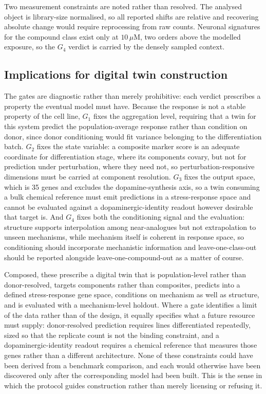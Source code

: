 \documentclass[5p,times,twocolumn]{elsarticle}
\begin{document}
Two measurement constraints are noted rather than resolved. The analysed object
is library-size normalised, so all reported shifts are relative and recovering
absolute change would require reprocessing from raw counts. Neuronal signatures
for the compound class exist only at $10\,\mu$M, two orders above the modelled
exposure, so the $G_4$ verdict is carried by the densely sampled context.

\subsection{\textbf{Implications for digital twin construction}}

The gates are diagnostic rather than merely prohibitive: each verdict prescribes
a property the eventual model must have. Because the response is not a stable
property of the cell line, $G_1$ fixes the aggregation level, requiring that a
twin for this system predict the population-average response rather than
condition on donor, since donor conditioning would fit variance belonging to the
differentiation batch. $G_2$ fixes the state variable: a composite marker score
is an adequate coordinate for differentiation stage, where its components
covary, but not for prediction under perturbation, where they need not, so
perturbation-responsive dimensions must be carried at component resolution.
$G_3$ fixes the output space, which is 35 genes and excludes the
dopamine-synthesis axis, so a twin consuming a bulk chemical reference must emit
predictions in a stress-response space and cannot be evaluated against a
dopaminergic-identity readout however desirable that target is. And $G_4$ fixes
both the conditioning signal and the evaluation: structure supports
interpolation among near-analogues but not extrapolation to unseen mechanisms,
while mechanism itself is coherent in response space, so conditioning should
incorporate mechanistic information and leave-one-class-out should be reported
alongside leave-one-compound-out as a matter of course.

Composed, these prescribe a digital twin that is population-level rather than
donor-resolved, targets components rather than composites, predicts into a
defined stress-response gene space, conditions on mechanism as well as
structure, and is evaluated with a mechanism-level holdout. Where a gate
identifies a limit of the data rather than of the design, it equally specifies
what a future resource must supply: donor-resolved prediction requires lines
differentiated repeatedly, sized so that the replicate count is not the binding
constraint, and a dopaminergic-identity readout requires a chemical reference
that measures those genes rather than a different architecture. None of these
constraints could have been derived from a benchmark comparison, and each would
otherwise have been discovered only after the corresponding model had been
built. This is the sense in which the protocol guides construction rather than
merely licensing or refusing it.
\end{document}
